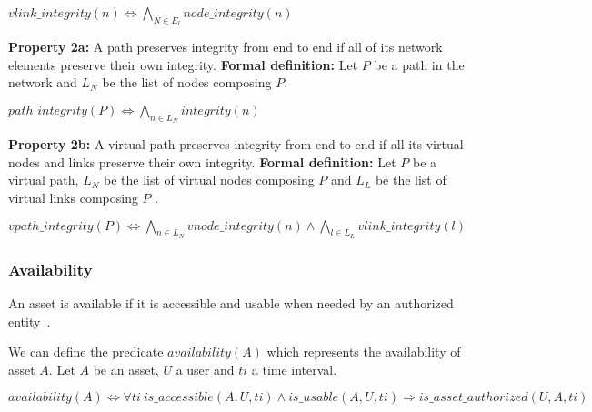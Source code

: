 \begin{myformula}
$vlink\_integrity(n) \Leftrightarrow \bigwedge\limits_{N \in E_l} node\_integrity(n)$
\end{myformula}


\textbf{Property 2a:} A path preserves integrity from end to end if all of its network elements preserve their own integrity.
\newline \textbf{Formal definition:} Let $P$ be a path in the network and $L_N$ be the list of nodes composing $P$.
\newline

\begin{myformula}
$path\_integrity(P) \Leftrightarrow \bigwedge\limits_{n \in L_N}integrity(n) $
\end{myformula}

\textbf{Property 2b:} A virtual path preserves integrity from end to end if all its virtual nodes and links preserve their own integrity.
\newline \textbf{Formal definition:} Let $P$ be a virtual path, $L_N$ be the list of virtual nodes composing $P$ and $L_L$ be the list of virtual links composing $P$ .
\newline

\begin{myformula}
$vpath\_integrity(P) \Leftrightarrow \bigwedge\limits_{n \in L_N}vnode\_integrity(n) \wedge \bigwedge\limits_{l \in L_L}vlink\_integrity(l) $
\end{myformula}


\subsubsection{Availability}
\label{sec:prop-avail}
An asset is available if it is accessible and usable when
needed by an authorized entity~\cite{ISO/IEC270012013}.

We can define the predicate $availability(A)$ which represents the availability of asset $A$.
\newline
Let $A$ be an asset, $U$ a user and $ti$ a time interval.
\newline

\begin{myformula}
$availability(A) \Leftrightarrow \forall ti~is\_accessible(A,U,ti) \wedge is\_usable(A,U,ti) \Rightarrow is\_asset\_authorized(U,A,ti)$
\end{myformula}

